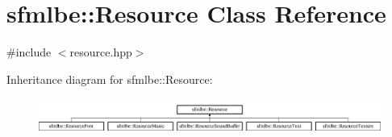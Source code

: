 \hypertarget{classsfmlbe_1_1_resource}{}\section{sfmlbe\+:\+:Resource Class Reference}
\label{classsfmlbe_1_1_resource}


{\ttfamily \#include $<$resource.\+hpp$>$}

Inheritance diagram for sfmlbe\+:\+:Resource\+:\begin{figure}[H]
\begin{center}
\leavevmode
\includegraphics[height=1.197861cm]{classsfmlbe_1_1_resource}
\end{center}
\end{figure}
